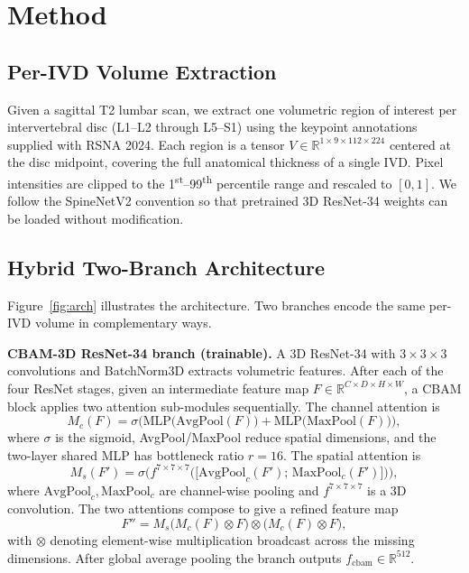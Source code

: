 \documentclass[conference]{IEEEtran}
\begin{document}
\section{Method}
\label{sec:method}

\subsection{Per-IVD Volume Extraction}

Given a sagittal T2 lumbar scan, we extract one volumetric region of
interest per intervertebral disc (L1--L2 through L5--S1) using the
keypoint annotations supplied with RSNA 2024. Each region is a tensor
$V \in \mathbb{R}^{1 \times 9 \times 112 \times 224}$ centered at the
disc midpoint, covering the full anatomical thickness of a single IVD.
Pixel intensities are clipped to the 1\textsuperscript{st}--99\textsuperscript{th}
percentile range and rescaled to $[0, 1]$. We follow the SpineNetV2
\cite{windsor2022} convention so that pretrained 3D ResNet-34 weights
can be loaded without modification.

\subsection{Hybrid Two-Branch Architecture}

Figure~\ref{fig:arch} illustrates the architecture. Two branches encode
the same per-IVD volume in complementary ways.

\textbf{CBAM-3D ResNet-34 branch (trainable).}
A 3D ResNet-34 with $3\!\times\!3\!\times\!3$ convolutions and BatchNorm3D
extracts volumetric features. After each of the four ResNet stages, given
an intermediate feature map
$F \in \mathbb{R}^{C \times D \times H \times W}$, a CBAM block applies
two attention sub-modules sequentially. The channel attention is
\begin{equation}
M_c(F) = \sigma\!\Big(\text{MLP}\big(\text{AvgPool}(F)\big)
                    + \text{MLP}\big(\text{MaxPool}(F)\big)\Big),
\label{eq:cbam_channel}
\end{equation}
where $\sigma$ is the sigmoid, AvgPool/MaxPool reduce spatial dimensions,
and the two-layer shared MLP has bottleneck ratio $r=16$. The spatial
attention is
\begin{equation}
M_s(F') = \sigma\!\Big(f^{7 \times 7 \times 7}\!
                      \big(\big[\text{AvgPool}_c(F');\,
                                \text{MaxPool}_c(F')\big]\big)\Big),
\label{eq:cbam_spatial}
\end{equation}
where $\text{AvgPool}_c, \text{MaxPool}_c$ are channel-wise pooling and
$f^{7\times7\times7}$ is a 3D convolution. The two attentions compose
to give a refined feature map
\begin{equation}
F'' = M_s\!\big(M_c(F) \otimes F\big) \otimes \big(M_c(F) \otimes F\big),
\label{eq:cbam}
\end{equation}
with $\otimes$ denoting element-wise multiplication broadcast across
the missing dimensions. After global average pooling the branch outputs
$f_{\text{cbam}} \in \mathbb{R}^{512}$.
\end{document}
